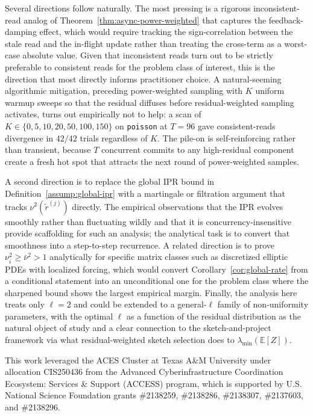 \documentclass[pdflatex,sn-mathphys-num]{sn-jnl}%
\newcommand{\E}{\mathbb{E}}
\theoremstyle{thmstyleone}%
\theoremstyle{thmstyletwo}%
\theoremstyle{thmstylethree}%
\begin{document}
Several directions follow naturally. The most pressing is a rigorous
inconsistent-read analog of Theorem~\ref{thm:async-power-weighted} that
captures the feedback-damping effect, which would require tracking the
sign-correlation between the stale read and the in-flight update rather
than treating the cross-term as a worst-case absolute value. Given that
inconsistent reads turn out to be strictly preferable to consistent
reads for the problem class of interest, this is the direction that most
directly informs practitioner choice. A natural-seeming algorithmic
mitigation, preceding power-weighted sampling with $K$ uniform warmup
sweeps so that the residual diffuses before residual-weighted sampling
activates, turns out empirically not to help: a scan of
$K \in \{0, 5, 10, 20, 50, 100, 150\}$ on \texttt{poisson} at $T = 96$
gave consistent-reads divergence in $42/42$ trials regardless of $K$.
The pile-on is self-reinforcing rather than transient, because $T$
concurrent commits to any high-residual component create a fresh hot
spot that attracts the next round of power-weighted samples.

A second direction is to replace the global IPR bound in
Definition~\ref{assump:global-ipr} with a martingale or filtration
argument that tracks $\nu^2(\tilde r^{(j)})$ directly. The empirical
observations that the IPR evolves smoothly rather than fluctuating
wildly and that it is concurrency-insensitive provide scaffolding for
such an analysis; the analytical task is to convert that smoothness
into a step-to-step recurrence. A related direction is to prove
$\nu_i^2 \geq \bar\nu^2 > 1$ analytically for specific matrix classes
such as discretized elliptic PDEs with localized forcing, which would
convert Corollary~\ref{cor:global-rate} from a conditional statement
into an unconditional one for the problem class where the sharpened
bound shows the largest empirical margin. Finally, the analysis here
treats only $\ell = 2$ and could be extended to a general-$\ell$ family
of non-uniformity parameters, with the optimal $\ell$ as a function of
the residual distribution as the natural object of study and a clear
connection to the sketch-and-project framework via what residual-weighted
sketch selection does to $\lambda_{\min}(\E[Z])$.


This work leveraged the ACES Cluster at Texas A\&M University under
allocation CIS250436 from the Advanced Cyberinfrastructure Coordination
Ecosystem: Services \& Support (ACCESS) program, which is supported by
U.S. National Science Foundation grants \#2138259, \#2138286, \#2138307,
\#2137603, and \#2138296.
\end{document}
